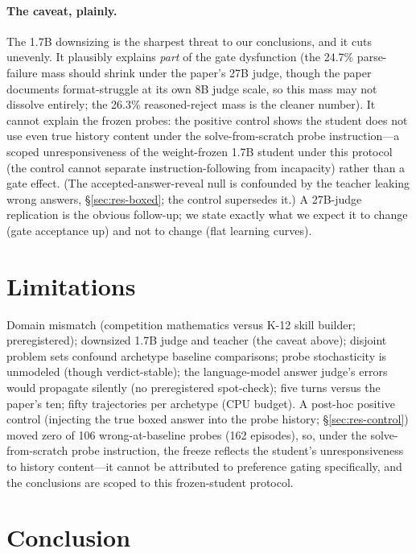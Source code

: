 \documentclass[notitlepage,12pt]{jedm}
\begin{document}
\paragraph{The caveat, plainly.} The 1.7B downsizing is the sharpest threat
to our conclusions, and it cuts unevenly. It plausibly explains \emph{part}
of the gate dysfunction (the 24.7\% parse-failure mass should shrink under
the paper's 27B judge, though the paper documents format-struggle at its own
8B judge scale, so this mass may not dissolve entirely; the 26.3\% reasoned-reject mass is the cleaner
number). It cannot explain the frozen probes: the positive control shows the
student does not use even true history content under the solve-from-scratch
probe instruction---a scoped unresponsiveness of the weight-frozen 1.7B
student under this protocol (the control cannot separate
instruction-following from incapacity) rather than a gate effect. (The
accepted-answer-reveal null is confounded by the teacher leaking wrong
answers, \S\ref{sec:res-boxed}; the control supersedes it.) A
27B-judge replication is the obvious follow-up; we state exactly what we
expect it to change (gate acceptance up) and not to change (flat learning
curves).

\section{Limitations}
\label{sec:limitations}

Domain mismatch (competition mathematics versus K-12 skill builder;
preregistered); downsized 1.7B judge and teacher (the caveat above);
disjoint problem sets confound archetype baseline comparisons; probe
stochasticity is unmodeled (though verdict-stable); the language-model
answer judge's errors would propagate silently (no preregistered
spot-check); five turns versus the paper's ten; fifty trajectories per
archetype (CPU budget). A post-hoc positive control (injecting the true
boxed answer into the probe history; \S\ref{sec:res-control}) moved zero
of 106 wrong-at-baseline probes (162 episodes), so, under the
solve-from-scratch probe instruction, the freeze reflects the student's
unresponsiveness to history content---it cannot be attributed to
preference gating specifically, and the conclusions are scoped to this
frozen-student protocol.

\section{Conclusion}
\label{sec:conclusion}
\end{document}
